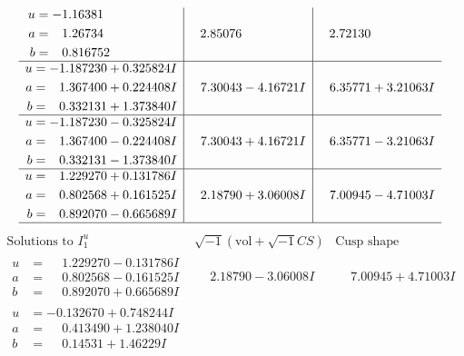 \documentclass[1p]{elsarticle_modified}
\theoremstyle{definition}
\newcommand{\I}{\sqrt{-1}}
\begin{document}
$$\begin{array}{c|c|c}
\begin{aligned}
u &= -1.16381\phantom{ +0.000000I} \\
a &= \phantom{-}1.26734\phantom{ +0.000000I} \\
b &= \phantom{-}0.816752\phantom{ +0.000000I}\end{aligned}
 & \phantom{-}2.85076\phantom{ +0.000000I} & \phantom{-}2.72130\phantom{ +0.000000I} \\ \hline\begin{aligned}
u &= -1.187230 + 0.325824 I \\
a &= \phantom{-}1.367400 + 0.224408 I \\
b &= \phantom{-}0.332131 + 1.373840 I\end{aligned}
 & \phantom{-}7.30043 - 4.16721 I & \phantom{-}6.35771 + 3.21063 I \\ \hline\begin{aligned}
u &= -1.187230 - 0.325824 I \\
a &= \phantom{-}1.367400 - 0.224408 I \\
b &= \phantom{-}0.332131 - 1.373840 I\end{aligned}
 & \phantom{-}7.30043 + 4.16721 I & \phantom{-}6.35771 - 3.21063 I \\ \hline\begin{aligned}
u &= \phantom{-}1.229270 + 0.131786 I \\
a &= \phantom{-}0.802568 + 0.161525 I \\
b &= \phantom{-}0.892070 - 0.665689 I\end{aligned}
 & \phantom{-}2.18790 + 3.06008 I & \phantom{-}7.00945 - 4.71003 I\\
 \hline 
 \end{array}$$\newpage$$\begin{array}{c|c|c}  
\text{Solutions to }I^u_{1}& \I (\text{vol} + \sqrt{-1}CS) & \text{Cusp shape}\\
 \hline 
\begin{aligned}
u &= \phantom{-}1.229270 - 0.131786 I \\
a &= \phantom{-}0.802568 - 0.161525 I \\
b &= \phantom{-}0.892070 + 0.665689 I\end{aligned}
 & \phantom{-}2.18790 - 3.06008 I & \phantom{-}7.00945 + 4.71003 I \\ \hline\begin{aligned}
u &= -0.132670 + 0.748244 I \\
a &= \phantom{-}0.413490 + 1.238040 I \\
b &= \phantom{-}0.14531 + 1.46229 I\end{aligned}

\end{array}$$
\end{document}
